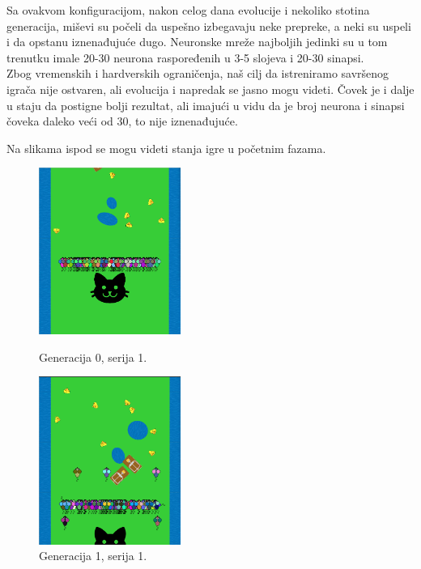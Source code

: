 \documentclass[a4paper]{article}
\begin{document}
Sa ovakvom konfiguracijom, nakon celog dana evolucije i nekoliko stotina generacija, miševi su počeli da uspešno izbegavaju neke prepreke, a neki su uspeli i da opstanu iznenađujuće dugo. Neuronske mreže najboljih jedinki su u tom trenutku imale 20-30 neurona raspoređenih u 3-5 slojeva i 20-30 sinapsi. \\

Zbog vremenskih i hardverskih ograničenja, naš cilj da istreniramo savršenog igrača nije ostvaren, ali evolucija i napredak se jasno mogu videti. Čovek je i dalje u staju da postigne bolji rezultat, ali imajući u vidu da je broj neurona i sinapsi čoveka daleko veći od 30, to nije iznenađujuće.


Na slikama ispod se mogu videti stanja igre u početnim fazama.

\begin{figure}[!h]
  \centering
  \begin{minipage}[b]{0.4\textwidth}
    \includegraphics[width=175px]{gen0_batch1.png}
    \caption{Generacija 0, serija 1.}
    \label{fig:gen0batch1}
  \end{minipage}
  \hfill
  \begin{minipage}[b]{0.4\textwidth}
    \includegraphics[width=175px]{gen1_batch1.png}
    \caption{Generacija 1, serija 1.}
    \label{fig:gen1batch1}
  \end{minipage}
\end{figure}
\end{document}
